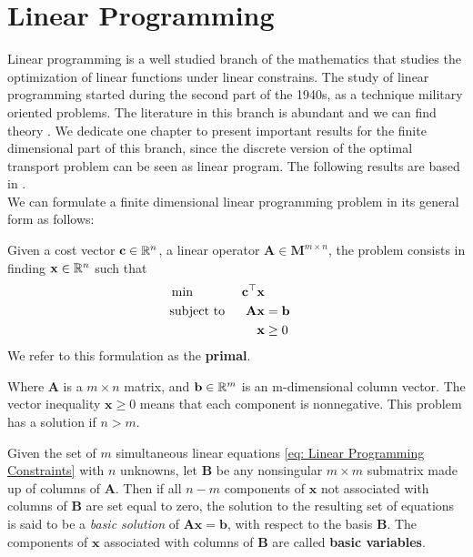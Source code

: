 \chapter{Linear Programming}
Linear programming is a well studied branch of the mathematics that studies the optimization of linear functions under linear constrains. The study of linear programming started during the second part of the 1940s, as a technique military oriented problems. The literature in this branch is abundant and we can find theory . We dedicate one chapter to present important results for the finite dimensional part of this branch, since the discrete version of the optimal transport problem can be seen as linear program. The following results are based in \cite{Luenberger2007LinNonLinProg}.  \\

We can formulate a finite dimensional linear programming problem in its general form as follows:

\begin{problem}
\label{pro: Linear Programming General Formulation.}
Given a cost vector $\mathbf{c}\in \mathbb{R}^n$, a linear operator $\mathbf{A} \in \mathbf M^{m\times n}$, the problem consists in finding $\mathbf{x}\in\mathbb{R}^n$ such that 
\begin{align}
	&\min & \mathbf{c}^\top\mathbf{x} \label{eq: Linear Programming Min}&\\
	&\text{subject to }& \mathbf{A}\mathbf{x}&=\mathbf{b} & \label{eq: Linear Programming Constraints} \\
	& &\mathbf{x}&\geq 0 & \label{eq: Linear Programming cone}
\end{align} 
We refer to this formulation as the \textbf{primal}.
\end{problem}
Where $\mathbf{A}$ is a $m\times n$ matrix, and $\mathbf{b}\in\mathbb{R}^m$ is an m-dimensional column vector. The vector inequality $\mathbf{x}\geq 0$ means that each component is nonnegative. This problem has a solution if $n>m$. 

\begin{definition}
	Given the set of $m$ simultaneous linear equations \eqref{eq: Linear Programming Constraints} with $n$ unknowns, let $\mathbf{B}$ be any nonsingular $m\times m$ submatrix made up of columns of $\mathbf{A}$. Then if all $n-m$ components of $\mathbf{x}$ not associated with columns of $\mathbf{B}$ are set equal to zero, the solution to the resulting set of equations is said to be a \textit{basic solution} of $\mathbf{Ax}=\mathbf{b}$, with respect to the basis $\mathbf{B}$. The components of $\mathbf{x}$ associated with columns of $\mathbf{B}$ are called \textbf{basic variables}.
\end{definition}

